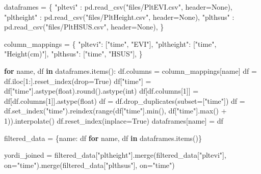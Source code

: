 \documentclass[
  letterpaper,
  DIV=11,
  numbers=noendperiod]{scrartcl}
\newenvironment{Shaded}{\begin{snugshade}}{\end{snugshade}}
\newcommand{\BuiltInTok}[1]{\textcolor[rgb]{0.00,0.23,0.31}{#1}}
\newcommand{\ControlFlowTok}[1]{\textcolor[rgb]{0.00,0.23,0.31}{\textbf{#1}}}
\newcommand{\DecValTok}[1]{\textcolor[rgb]{0.68,0.00,0.00}{#1}}
\newcommand{\KeywordTok}[1]{\textcolor[rgb]{0.00,0.23,0.31}{\textbf{#1}}}
\newcommand{\NormalTok}[1]{\textcolor[rgb]{0.00,0.23,0.31}{#1}}
\newcommand{\OperatorTok}[1]{\textcolor[rgb]{0.37,0.37,0.37}{#1}}
\newcommand{\StringTok}[1]{\textcolor[rgb]{0.13,0.47,0.30}{#1}}
\newcommand{\VariableTok}[1]{\textcolor[rgb]{0.07,0.07,0.07}{#1}}
\begin{document}
\begin{Shaded}
\begin{Highlighting}[]
\NormalTok{dataframes }\OperatorTok{=}\NormalTok{ \{}
    \StringTok{"pltevi"}\NormalTok{ : pd.read\_csv(}\StringTok{"files/PltEVI.csv"}\NormalTok{, header}\OperatorTok{=}\VariableTok{None}\NormalTok{),}
    \StringTok{"pltheight"}\NormalTok{ : pd.read\_csv(}\StringTok{"files/PltHeight.csv"}\NormalTok{, header}\OperatorTok{=}\VariableTok{None}\NormalTok{),}
    \StringTok{"plthsus"}\NormalTok{ : pd.read\_csv(}\StringTok{"files/PltHSUS.csv"}\NormalTok{, header}\OperatorTok{=}\VariableTok{None}\NormalTok{),}
\NormalTok{\}}

\NormalTok{column\_mappings }\OperatorTok{=}\NormalTok{ \{}
    \StringTok{"pltevi"}\NormalTok{: [}\StringTok{"time"}\NormalTok{, }\StringTok{"EVI"}\NormalTok{],}
    \StringTok{"pltheight"}\NormalTok{: [}\StringTok{"time"}\NormalTok{, }\StringTok{"Height(cm)"}\NormalTok{],}
    \StringTok{"plthsus"}\NormalTok{: [}\StringTok{"time"}\NormalTok{, }\StringTok{"HSUS"}\NormalTok{],}
\NormalTok{\}}

\ControlFlowTok{for}\NormalTok{ name, df }\KeywordTok{in}\NormalTok{ dataframes.items():}
\NormalTok{    df.columns }\OperatorTok{=}\NormalTok{ column\_mappings[name] }
\NormalTok{    df }\OperatorTok{=}\NormalTok{ df.iloc[}\DecValTok{1}\NormalTok{:].reset\_index(drop}\OperatorTok{=}\VariableTok{True}\NormalTok{) }
\NormalTok{    df[}\StringTok{"time"}\NormalTok{] }\OperatorTok{=}\NormalTok{ df[}\StringTok{"time"}\NormalTok{].astype(}\BuiltInTok{float}\NormalTok{).}\BuiltInTok{round}\NormalTok{().astype(}\BuiltInTok{int}\NormalTok{) }
\NormalTok{    df[df.columns[}\DecValTok{1}\NormalTok{]] }\OperatorTok{=}\NormalTok{ df[df.columns[}\DecValTok{1}\NormalTok{]].astype(}\BuiltInTok{float}\NormalTok{) }
\NormalTok{    df }\OperatorTok{=}\NormalTok{ df.drop\_duplicates(subset}\OperatorTok{=}\NormalTok{[}\StringTok{"time"}\NormalTok{])  }
\NormalTok{    df }\OperatorTok{=}\NormalTok{ df.set\_index(}\StringTok{"time"}\NormalTok{).reindex(}\BuiltInTok{range}\NormalTok{(df[}\StringTok{"time"}\NormalTok{].}\BuiltInTok{min}\NormalTok{(), df[}\StringTok{"time"}\NormalTok{].}\BuiltInTok{max}\NormalTok{() }\OperatorTok{+} \DecValTok{1}\NormalTok{)).interpolate()}
\NormalTok{    df.reset\_index(inplace}\OperatorTok{=}\VariableTok{True}\NormalTok{)}
\NormalTok{    dataframes[name] }\OperatorTok{=}\NormalTok{ df}

\NormalTok{filtered\_data }\OperatorTok{=}\NormalTok{ \{name: df }\ControlFlowTok{for}\NormalTok{ name, df }\KeywordTok{in}\NormalTok{ dataframes.items()\}}

\NormalTok{yordi\_joined }\OperatorTok{=}\NormalTok{ filtered\_data[}\StringTok{"pltheight"}\NormalTok{].merge(filtered\_data[}\StringTok{"pltevi"}\NormalTok{], on}\OperatorTok{=}\StringTok{"time"}\NormalTok{).merge(filtered\_data[}\StringTok{"plthsus"}\NormalTok{], on}\OperatorTok{=}\StringTok{"time"}\NormalTok{)}
\end{Highlighting}
\end{Shaded}
\end{document}
